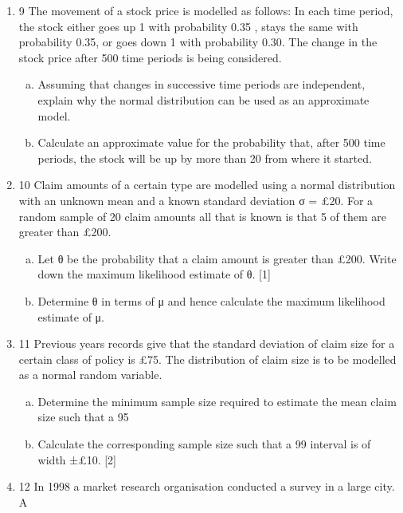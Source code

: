 \documentclass[a4paper,12pt]{article}
\begin{document}
\begin{enumerate}

\item 9 The movement of a stock price is modelled as follows:
In each time period, the stock either goes up 1 with probability 0.35 , stays the
same with probability 0.35, or goes down 1 with probability 0.30.
The change in the stock price after 500 time periods is being considered.
\begin{enumerate}[(a)]
\item Assuming that changes in successive time periods are independent,
explain why the normal distribution can be used as an approximate
model. 
\item  Calculate an approximate value for the probability that, after 500 time periods, the stock will be up by more than 20 from where it started. 
\end{enumerate}
\item 10 Claim amounts of a certain type are modelled using a normal distribution with an unknown mean and a known standard deviation σ = £20.
For a random sample of 20 claim amounts all that is known is that 5 of them are
greater than £200.
\begin{enumerate}[(a)]
\item  Let θ be the probability that a claim amount is greater than £200. Write
down the maximum likelihood estimate of θ. [1]
\item Determine θ in terms of μ and hence calculate the maximum likelihood
estimate of μ. 
\end{enumerate}
\item 11 Previous years records give that the standard deviation of claim size for a certain
class of policy is £75. The distribution of claim size is to be modelled as a normal
random variable.
\begin{enumerate}[(a)]
\item Determine the minimum sample size required to estimate the mean claim
size such that a 95%
\item Calculate the corresponding sample size such that a 99%
interval is of width ±£10. [2]
\end{enumerate}
\item 12 In 1998 a market research organisation conducted a survey in a large city. A

\end{enumerate}
\end{document}
